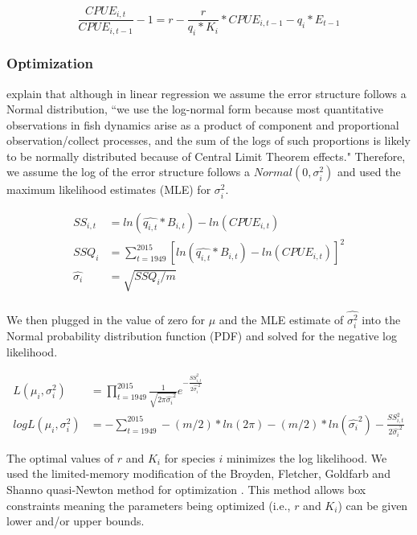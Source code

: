 \documentclass[oneside,12pt,final]{sty/ucthesis-CA2012}
\let\cite\citep                             %
\begin{document}
\begin{mainmatter}
\begin{equation} \label{regression}
\frac{CPUE_{i,t}}{CPUE_{i,t-1} } -1 = r -\frac{r}{q_i*K_i}*CPUE_{i,t-1}  - q_i*E_{t-1} 
\end{equation}

\subsubsection*{Optimization} 
\citet{walters_fisheries_2004} explain that although in linear regression we assume the error structure follows a Normal distribution, ``we use the log-normal form because most quantitative observations in fish dynamics arise as a product of component and proportional observation/collect processes, and the sum of the logs of such proportions is likely to be normally distributed because of Central Limit Theorem effects." Therefore, we assume the log of the error structure follows a $Normal(0,\sigma_i^2)$ and used the maximum likelihood estimates (MLE) for $\sigma_i^2$.  

 \begin{align*}
SS_{i,t} & = ln(\widehat{q_{i,t}}*B_{i,t}) - ln(CPUE_{i,t}) \\
SSQ_i & = \sum_{t=1949}^{2015}[ln(\widehat{q_{i,t}}*B_{i,t}) - ln(CPUE_{i,t})]^2  \\
\widehat{\sigma_i} &=\sqrt{SSQ_i/m} \\
\end{align*} 

We then plugged in the value of zero for $\mu$ and the MLE estimate of $\widehat{\sigma_i^2}$ into the Normal probability distribution function (PDF) and solved for the negative log likelihood. 

\begin{align*}
L(\mu_i,\sigma_i^2) &= \prod_{t=1949}^{2015} \frac{1}{\sqrt{2\pi\widehat{\sigma_i}^2}}e^{-\frac{SS_{i,t}^2}{2\widehat{\sigma_i}^2}} \\
logL(\mu_i,\sigma_i^2) &= - \sum_{t=1949}^{2015} -(m/2)*ln(2\pi) - (m/2)*ln(\widehat{\sigma_i}^2) - \frac{SS_{i,t}^2}{2\widehat{\sigma_i}^2}
\end{align*}

The optimal values of $r$ and $K_i$ for species $i$ minimizes the log likelihood. We used the limited-memory modification of the Broyden, Fletcher, Goldfarb and Shanno quasi-Newton method for optimization \cite{shanno1970conditioning,byrd1995limited}. This method allows box constraints meaning the parameters being optimized (i.e., $r$ and $K_i$) can be given lower and/or upper bounds. 


\end{mainmatter}
\end{document}
